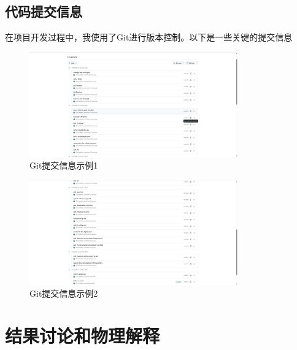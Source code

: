 \documentclass[UTF8]{ctexart}
\begin{document}
\subsection{代码提交信息}
在项目开发过程中，我使用了Git进行版本控制。以下是一些关键的提交信息
\begin{figure}[H]
    \centering
    \includegraphics[width=0.8\textwidth]{c1.png}
    \caption{Git提交信息示例1}
    \label{fig:git_commit_info1}
\end{figure}
\begin{figure}
    \centering
    \includegraphics[width=0.8\textwidth]{c2.png}
    \caption{Git提交信息示例2}
    \label{fig:git_commit_info2}
\end{figure}


\newpage
\section{结果讨论和物理解释}



\newpage
\appendix
\end{document}
